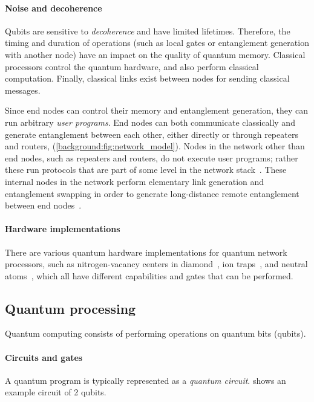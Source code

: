 \paragraph{Noise and decoherence}
Qubits are sensitive to \emph{decoherence} and have limited lifetimes.
Therefore, the timing and duration of operations (such as local gates or entanglement generation with another node) have an impact on the quality of quantum memory. Classical processors control the quantum hardware, and also perform classical computation.
Finally, classical links exist between nodes for sending classical messages.

Since end nodes can control their memory and entanglement generation, they can run arbitrary \textit{user programs}.
End nodes can both communicate classically and generate entanglement between each other, either directly or through repeaters and routers, (\cref{background:fig:network_model}). Nodes in the network other than end nodes, such as repeaters and routers, do not execute user programs; rather these run protocols that are part of some level in the
network stack~\cite{dahlberg2019linklayer,kozlowski2020networklayer}.
These internal nodes in the network perform elementary link generation and entanglement swapping in order to generate long-distance remote entanglement between end nodes~\cite{dahlberg2019linklayer}.

\paragraph{Hardware implementations}
There are various quantum hardware implementations for quantum network processors, such as nitrogen-vacancy centers in diamond~\cite{Bernien2014}, ion traps~\cite{moehring2007entanglement}, and neutral atoms~\cite{hofmann2012heralded,ritter2012elementary}, which all have different capabilities and gates that can be performed.

\subsection{Quantum processing}
Quantum computing consists of performing operations on quantum bits (qubits).

\paragraph{Circuits and gates}
A quantum program is typically represented as a \emph{quantum circuit}.
 shows an example circuit of 2 qubits.


